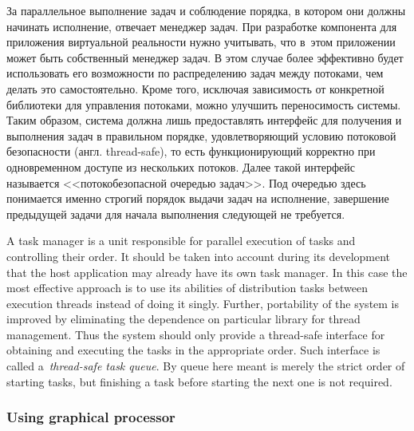 \documentclass[a4paper, 12pt, titlepage]{extarticle}
\newcommand{\eng}[1]{#1}
\begin{document}
\begin{original}
        За параллельное выполнение задач и соблюдение порядка, в котором они должны начинать
        исполнение, отвечает менеджер задач. При разработке компонента
        для приложения виртуальной реальности нужно учитывать, что в~этом приложении
        может быть собственный менеджер задач. В этом случае более эффективно
        будет использовать его возможности по распределению задач между потоками, чем делать это
        самостоятельно. Кроме того, исключая зависимость от конкретной библиотеки для управления
        потоками, можно улучшить переносимость системы. Таким образом, система должна лишь
        предоставлять интерфейс для получения и выполнения задач в правильном порядке,
        удовлетворяющий условию потоковой безопасности (англ. \eng{thread-safe}), то есть
        функционирующий корректно при одновременном доступе из нескольких потоков. Далее такой
        интерфейс называется <<потокобезопасной очередью задач>>. Под очередью здесь понимается именно строгий порядок выдачи
        задач на исполнение, завершение предыдущей задачи для начала выполнения следующей не требуется.
\end{original}

        A task manager is a unit responsible for parallel execution of tasks and controlling their
        order. It should be taken into account during its development that the host application may
        already have its own task manager. In this case the most effective approach is to use its
        abilities of distribution tasks between execution threads instead of doing it singly.
        Further, portability of the system is improved by eliminating the dependence on particular
        library for thread management. Thus the system should only provide a thread-safe interface
        for obtaining and executing the tasks in the appropriate order. Such interface is called
        a~\emph{thread-safe task queue}. By queue here meant is merely the strict order of starting
        tasks, but finishing a task before starting the next one is not required.

      \subsubsection{Using graphical processor}\label{sssec:using_gpu}
\end{document}
